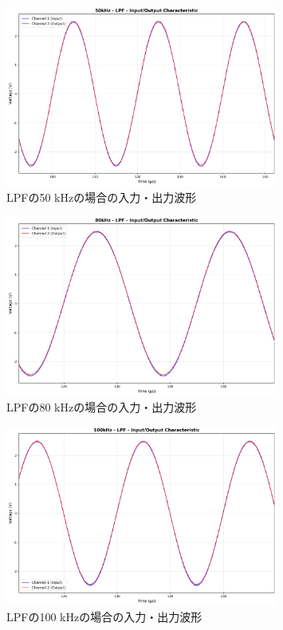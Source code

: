 \documentclass[11pt,dvipdfmx]{jarticle}
\begin{document}
\begin{figure}[H]
  \centering
  \includegraphics[width=0.8\textwidth]{graphs/50kHz_LPF_characteristic.png}
  \caption{LPFの50 kHzの場合の入力・出力波形}
  \label{fig:LPF_50kHz}
\end{figure}

\begin{figure}[H]
  \centering
  \includegraphics[width=0.8\textwidth]{graphs/80kHz_LPF_characteristic.png}
  \caption{LPFの80 kHzの場合の入力・出力波形}
  \label{fig:LPF_80kHz}
\end{figure}

\begin{figure}[H]
  \centering
  \includegraphics[width=0.8\textwidth]{graphs/100kHz_LPF_characteristic.png}
  \caption{LPFの100 kHzの場合の入力・出力波形}
  \label{fig:LPF_100kHz}
\end{figure}
\end{document}

